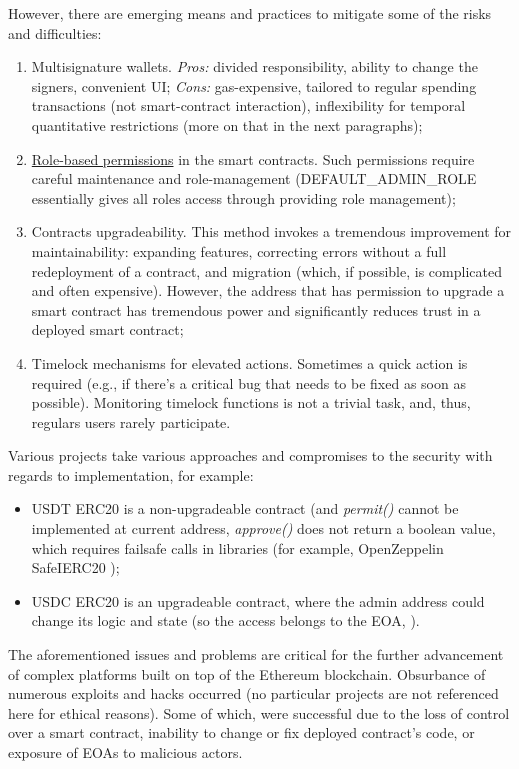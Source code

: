 \documentclass[12pt]{article}
\begin{document}
\medskip
However, there are emerging means and practices to mitigate some of the risks and difficulties:
\begin{enumerate}
\item{Multisignature wallets. \emph{Pros:} divided responsibility, ability to change the signers, convenient UI; \emph{Cons:} gas-expensive, tailored to regular spending transactions (not smart-contract interaction), inflexibility for temporal quantitative restrictions (more on that in the next paragraphs);}
\item{\href{https://docs.openzeppelin.com/contracts/2.x/access-control}{Role-based permissions}\cite{permissions_roles} in the smart contracts. Such permissions require careful maintenance and role-management (DEFAULT\_ADMIN\_ROLE essentially gives all roles access through providing role management);}
\item{Contracts upgradeability. This method invokes a tremendous improvement for maintainability: expanding features, correcting errors without a full redeployment of a contract, and migration (which, if possible, is complicated and often expensive). However, the address that has permission to upgrade a smart contract has tremendous power and significantly reduces trust in a deployed smart contract;}
\item{Timelock mechanisms for elevated actions. Sometimes a quick action is required (e.g., if there’s a critical bug that needs to be fixed as soon as possible). Monitoring timelock functions is not a trivial task, and, thus, regulars users rarely participate.}
\end{enumerate}

Various projects take various approaches and compromises to the security with regards to implementation, for example:
\begin{itemize}
\item{USDT ERC20 is a non-upgradeable contract (and \emph{permit()} cannot be implemented at current address, \emph{approve()} does not return a boolean value, which requires failsafe calls in libraries (for example, OpenZeppelin SafeIERC20 \cite{OZ_SafeIERC20});}
\item{USDC ERC20 is an upgradeable contract, where the admin address could change its logic and state (so the access belongs to the EOA, \cite{USDC_upgrade}).}
\end{itemize}

The aforementioned issues and problems are critical for the further advancement of complex platforms built on top of the Ethereum blockchain. Obsurbance of numerous exploits and hacks occurred (no particular projects are not referenced here for ethical reasons). Some of which, were successful due to the loss of control over a smart contract, inability to change or fix deployed contract’s code, or exposure of EOAs to malicious actors.
\end{document}
